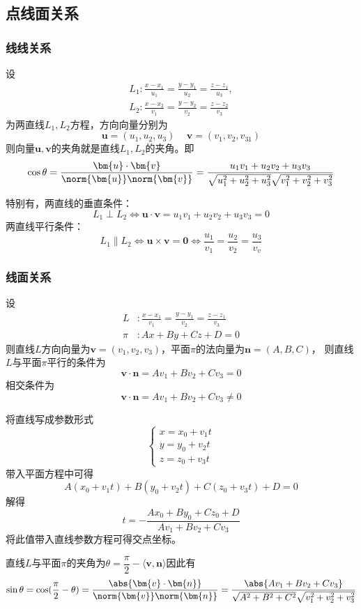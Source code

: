 \subsection{点线面关系}
\subsubsection{线线关系}
设
\begin{align*}
    L_1 : \frac{x-x_1}{u_1} = \frac{y-y_1}{u_2} = \frac{z-z_1}{u_3}, \\
    L_2 : \frac{x-x_2}{v_1} = \frac{y-y_2}{v_2} = \frac{z-z_2}{v_3}
\end{align*}
为两直线$L_1,L_2$方程，方向向量分别为
\[ \bm{u}=(u_1,u_2,u_3)\,\quad\bm{v}=(v_1,v_2,v_31) \]
则向量$\bm{u},\bm{v}$的夹角就是直线$L_1,L_2$的夹角。即
\[
    \cos\theta
    = \frac{\bm{u}\cdot\bm{v}}{\norm{\bm{u}} \norm{\bm{v}}}
    = \frac{u_1v_1 + u_2v_2 + u_3v_3}{\sqrt{u_1^2+u_2^2+u_3^2}\sqrt{v_1^2+v_2^2+v_3^2}}
\]

特别有，两直线的垂直条件：
\[ L_1 \perp L_2 \iff \bm{u}\cdot\bm{v} = u_1v_1 + u_2v_2 + u_3v_3 = 0 \]
两直线平行条件：
\[ L_1 \parallel L_2 \iff \bm{u}\times\bm{v} = \bm{0} \iff \frac{u_1}{v_1} = \frac{u_2}{v_2} = \frac{u_3}{v_v}  \]

\subsubsection{线面关系}
设
\begin{align*}
    L   & : \frac{x-x_1}{v_1} = \frac{y-y_1}{v_2} = \frac{z-z_1}{v_3} \\
    \pi & : Ax+By+Cz+D=0
\end{align*}
则直线$L$方向向量为$\bm{v}=(v_1,v_2,v_3)$，平面$\pi$的法向量为$\bm{n}=(A,B,C)$，
则直线$L$与平面$\pi$平行的条件为
\[ \bm{v}\cdot\bm{n} = Av_1 + Bv_2 + Cv_3 = 0 \]
相交条件为
\[ \bm{v}\cdot\bm{n} = Av_1 + Bv_2 + Cv_3 \neq 0 \]

将直线写成参数形式
\[
    \begin{cases}
        x = x_0 + v_1t \\
        y = y_0 + v_2t \\
        z = z_0 + v_3t
    \end{cases}
\]
带入平面方程中可得
\[ A(x_0 + v_1t)+B(y_0 + v_2t)+C(z_0 + v_3t)+D=0 \]
解得
\[ t = -\frac{Ax_0+By_0+Cz_0+D}{Av_1 + Bv_2 + Cv_3} \]
将此值带入直线参数方程可得交点坐标。

直线$L$与平面$\pi$的夹角为$\theta = \dfrac{\pi}{2} - \langle\bm{v},\bm{n}\rangle$因此有
\[
    \sin\theta = \cos(\frac{\pi}{2}-\theta)
    = \frac{\abs{\bm{v}\cdot\bm{n}}}{\norm{\bm{v}}\norm{\bm{n}}}
    = \frac{\abs{Av_1 + Bv_2 + Cv_3}}{\sqrt{A^2+B^2+C^2}\sqrt{v_1^2+v_2^2+v_3^2}}
\]

